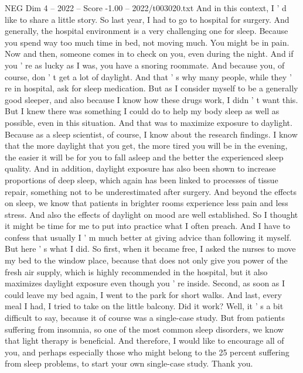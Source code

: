 \begin{textsample}{NEG Dim 4 – 2022 – Score -1.00 – 2022/t003020.txt}
And in this context, I ' d like to share a little story.
So last year, I had to go to hospital for surgery.
And generally, the hospital environment is a very challenging one for sleep.
Because you spend way too much time in bed, not moving much.
You might be in pain.
Now and then, someone comes in to check on you, even during the night.
And if you ' re as lucky as I was, you have a snoring roommate.
And because you, of course, don ' t get a lot of daylight.
And that ' s why many people, while they ' re in hospital, ask for sleep medication.
But as I consider myself to be a generally good sleeper, and also because I know how these drugs work, I didn ' t want this.
But I knew there was something I could do to help my body sleep as well as possible, even in this situation.
And that was to maximize exposure to daylight.
Because as a sleep scientist, of course, I know about the research findings.
I know that the more daylight that you get, the more tired you will be in the evening, the easier it will be for you to fall asleep and the better the experienced sleep quality.
And in addition, daylight exposure has also been shown to increase proportions of deep sleep, which again has been linked to processes of tissue repair, something not to be underestimated after surgery.
And beyond the effects on sleep, we know that patients in brighter rooms experience less pain and less stress.
And also the effects of daylight on mood are well established.
So I thought it might be time for me to put into practice what I often preach.
And I have to confess that usually I ' m much better at giving advice than following it myself.
But here ' s what I did.
So first, when it became free, I asked the nurses to move my bed to the window place, because that does not only give you power of the fresh air supply, which is highly recommended in the hospital, but it also maximizes daylight exposure even though you ' re inside.
Second, as soon as I could leave my bed again, I went to the park for short walks.
And last, every meal I had, I tried to take on the little balcony.
Did it work?
Well, it ' s a bit difficult to say, because it of course was a single-case study.
But from patients suffering from insomnia, so one of the most common sleep disorders, we know that light therapy is beneficial.
And therefore, I would like to encourage all of you, and perhaps especially those who might belong to the 25 percent suffering from sleep problems, to start your own single-case study.
Thank you.

\end{textsample}
